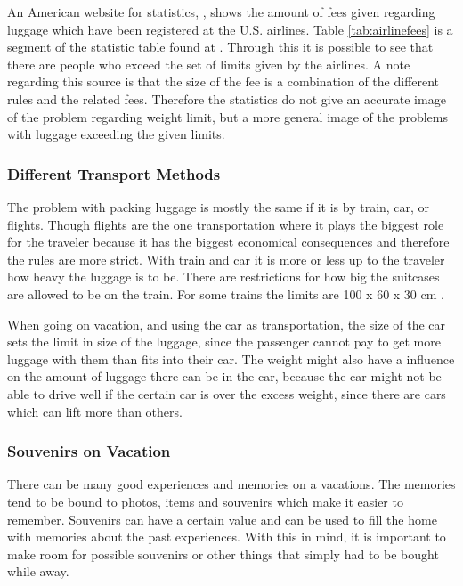 An American website for statistics, \citep{airstat}, shows the amount of fees given regarding luggage which have been registered at the U.S. airlines. Table \ref{tab:airlinefees} is a segment of the statistic table found at \citep{airstat}. Through this it is possible to see that there are people who exceed the set of limits given by the airlines. A note regarding this source is that the size of the fee is a combination of the different rules and the related fees. Therefore the statistics do not give an accurate image of the problem regarding weight limit, but a more general image of the problems with luggage exceeding the given limits.

\subsubsection{Different Transport Methods}
The problem with packing luggage is mostly the same if it is by train, car, or flights. Though flights are the one transportation where it plays the biggest role for the traveler because it has the biggest economical consequences and therefore the rules are more strict. With train and car it is more or less up to the traveler how heavy the luggage is to be. There are restrictions for how big the suitcases are allowed to be on the train. For some trains the limits are 100 x 60 x 30 cm \citep{rulestrain}.

When going on vacation, and using the car as transportation, the size of the car sets the limit in size of the luggage, since the passenger cannot pay to get more luggage with them than fits into their car. The weight might also have a influence on the amount of luggage there can be in the car, because the car might not be able to drive well if the certain car is over the excess weight, since there are cars which can lift more than others. %

\subsubsection{Souvenirs on Vacation}
There can be many good experiences and memories on a vacations. The memories tend to be bound to photos, items and souvenirs which make it easier to remember. Souvenirs can have a certain value and can be used to fill the home with memories about the past experiences.
With this in mind, it is important to make room for possible souvenirs or other things that simply had to be bought while away.

